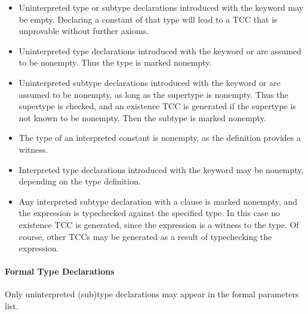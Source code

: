\begin{itemize}

\item Uninterpreted type or subtype declarations introduced with the
keyword  may be empty.  Declaring a constant of that type
will lead to a TCC that is unprovable without further axioms.

\item Uninterpreted type declarations introduced with the keyword
or  are assumed to be nonempty.
Thus the type is marked nonempty.

\item Uninterpreted subtype declarations introduced with the keyword
 or  are assumed to be nonempty, as long as the
supertype is nonempty.  Thus the supertype is checked, and an existence
TCC is generated if the supertype is not known to be nonempty.  Then the
subtype is marked nonempty.

\item The type of an interpreted constant is nonempty, as the definition
provides a witness.

\item Interpreted type declarations introduced with the keyword
 may be nonempty, depending on the type definition.

\item Any interpreted subtype declaration with a 
clause is marked nonempty, and the  expression is
typechecked against the specified type.  In this case no existence TCC is
generated, since the  expression is a witness to the
type.  Of course, other TCCs may be generated as a result of typechecking
the  expression.

\end{itemize}

\paragraph{Formal Type Declarations}

Only uninterpreted (sub)type declarations may appear in the formal
parameters list.

